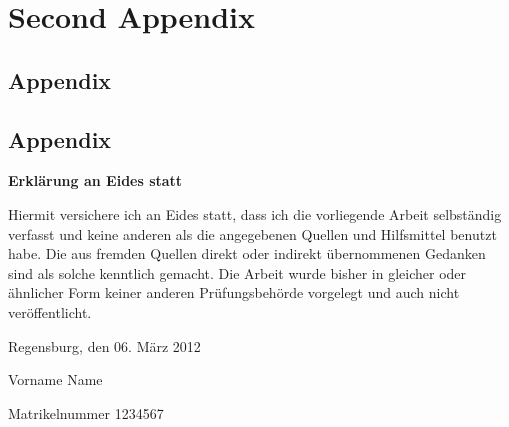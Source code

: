 \documentclass[11pt,a4paper,german,notitlepage]{report}
\newcommand{\authorname}{Vorname Name}
\newcommand{\matrikelnr}{1234567}
\newcommand{\abgabedatum}{06. März 2012}
\begin{document}
\chapter{Second Appendix}
\label{chap:appendix_B}

\section{Appendix}
\label{sec:appendix_B_1}

\section{Appendix}
\label{sec:appendix_B_2}

\clearpage

{}


\clearpage

%
%
%

\thispagestyle{empty}
\label{erklaerung}

\setlength{\parindent}{0em}

\textbf{\large{Erklärung an Eides statt}}

\vspace*{20pt}
Hiermit versichere ich an Eides statt, dass ich die vorliegende Arbeit selbständig verfasst und keine anderen als die angegebenen Quellen und Hilfsmittel benutzt habe. Die aus fremden Quellen direkt oder indirekt übernommenen Gedanken sind als solche kenntlich gemacht. Die Arbeit wurde bisher in gleicher oder ähnlicher Form keiner anderen Prüfungsbehörde vorgelegt und auch nicht veröffentlicht.

\vspace*{65pt}


Regensburg, den \abgabedatum

\vspace*{60pt}


\authorname

Matrikelnummer \matrikelnr
\end{document}
